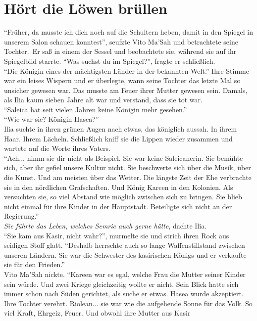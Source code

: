 \chapter{Hört die Löwen brüllen}

``Früher, da musste ich dich noch auf die Schultern heben, damit in den Spiegel in unserem Salon 
schauen konntest'', seufzte Vito Ma'Sah und betrachtete seine Tochter.\
Er saß in einem der Sessel und beobachtete sie, während sie auf ihr Spiegelbild starrte. 
``Was suchst du im Spiegel?'', fragte er schließlich.\\
``Die Königin eines der mächtigsten Länder in der bekannten Welt.'' Ihre Stimme war ein 
leises Wispern und er überlegte, wann seine Tochter das letzte Mal so unsicher gewesen war. Das 
musste am Feuer ihrer Mutter gewesen sein. Damals, als Ilia kaum sieben Jahre alt war und verstand, 
dass sie tot war.\\
``Saleica hat seit vielen Jahren keine Königin mehr gesehen.''\\
``Wie war sie? Königin Hasea?''\\
Ilia suchte in ihren grünen Augen nach etwas, das königlich aussah. In ihrem Haar. Ihrem Lächeln. 
Schließlich kniff sie die Lippen wieder zusammen und wartete auf die Worte ihres Vaters.\\
``Ach... nimm sie dir nicht als Beispiel. Sie war keine Saleicanerin. Sie bemühte sich, aber ihr 
gefiel unsere Kultur nicht. Sie beschwerte sich über die Musik, über die Kunst. Und am meisten über 
das Wetter. Die längste Zeit der Ehe verbrachte sie in den nördlichen Grafschaften. Und König 
Kareen in den Kolonien. Als versuchten sie, so viel Abstand wie möglich zwischen sich zu bringen. 
Sie blieb nicht einmal für ihre Kinder in der Hauptstadt. Beteiligte sich nicht an der 
Regierung.''\\
\textit{Sie führte das Leben, welches Semric auch gerne hätte}, dachte Ilia.\\
``Sie kam aus Kasir, nicht wahr?'', murmelte sie und strich ihren Rock aus seidigen Stoff 
glatt. ``Deshalb herrschte auch so lange Waffenstillstand zwischen unseren Ländern. Sie war die 
Schwester des kasirischen Königs und er verkaufte sie für den Frieden.''\\
Vito Ma'Sah nickte. ``Kareen war es egal, welche Frau die Mutter seiner Kinder sein würde. Und 
zwei Kriege gleichzeitig wollte er nicht. Sein Blick hatte sich immer schon nach Süden gerichtet, 
als suche er etwas. Hasea wurde akzeptiert. Ihre Tochter verehrt. Riolean... sie war wie die 
aufgehende Sonne für das Volk. So viel Kraft, Ehrgeiz, Feuer. Und obwohl ihre Mutter aus Kasir 
